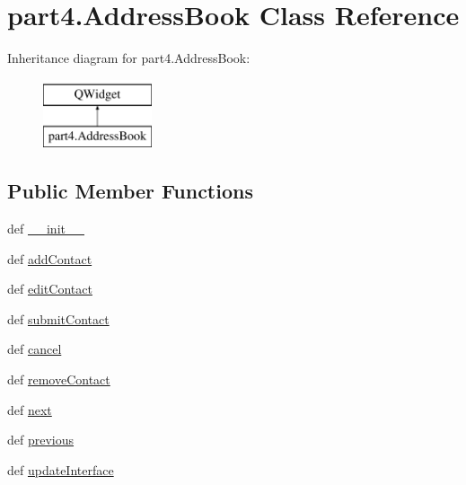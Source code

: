 \hypertarget{classpart4_1_1AddressBook}{}\section{part4.\+Address\+Book Class Reference}
\label{classpart4_1_1AddressBook}
Inheritance diagram for part4.\+Address\+Book\+:\begin{figure}[H]
\begin{center}
\leavevmode
\includegraphics[height=2.000000cm]{classpart4_1_1AddressBook}
\end{center}
\end{figure}
\subsection*{Public Member Functions}
\begin{DoxyCompactItemize}
\item 
def \hyperlink{classpart4_1_1AddressBook_a4193302df5a7c4c7201e1a83e8c5ce73}{\+\_\+\+\_\+init\+\_\+\+\_\+}
\item 
def \hyperlink{classpart4_1_1AddressBook_ae96e96e2f9da9655721ed3c9fd68c280}{add\+Contact}
\item 
def \hyperlink{classpart4_1_1AddressBook_a0701f139f3b70afbf7c44a8a45a42732}{edit\+Contact}
\item 
def \hyperlink{classpart4_1_1AddressBook_a130ba3a07b8770793024f13303b97eed}{submit\+Contact}
\item 
def \hyperlink{classpart4_1_1AddressBook_a8a944b704806b42bfdf04304b854243b}{cancel}
\item 
def \hyperlink{classpart4_1_1AddressBook_a3c51ca80d136b5c8eeac67c9f9473061}{remove\+Contact}
\item 
def \hyperlink{classpart4_1_1AddressBook_a3da0d774be08dda81f97c017c211e6ee}{next}
\item 
def \hyperlink{classpart4_1_1AddressBook_a8b06c0849d845fa8df929c913ae9af9f}{previous}
\item 
def \hyperlink{classpart4_1_1AddressBook_a680652b086225353083794d880dbb7b9}{update\+Interface}
\end{DoxyCompactItemize}
